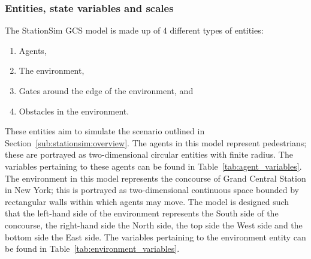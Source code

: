 \subsubsection{Entities, state variables and
scales}\label{subs:stationsim:overview:entities}

The StationSim GCS model is made up of 4 different types of entities:
\begin{enumerate}
    \item Agents,
    \item The environment,
    \item Gates around the edge of the environment, and
    \item Obstacles in the environment.
\end{enumerate}
These entities aim to simulate the scenario outlined in
Section~\ref{sub:stationsim:overview}.
The agents in this model represent pedestrians; these are portrayed as
two-dimensional circular entities with finite radius.
The variables pertaining to these agents can be found in
Table~\ref{tab:agent_variables}.
The environment in this model represents the concourse of Grand Central Station
in New York; this is portrayed as two-dimensional continuous space bounded by
rectangular walls within which agents may move.
The model is designed such that the left-hand side of the environment
represents the South side of the concourse, the right-hand side the North side,
the top side the West side and the bottom side the East side.
The variables pertaining to the environment entity can be found in
Table~\ref{tab:environment_variables}.


